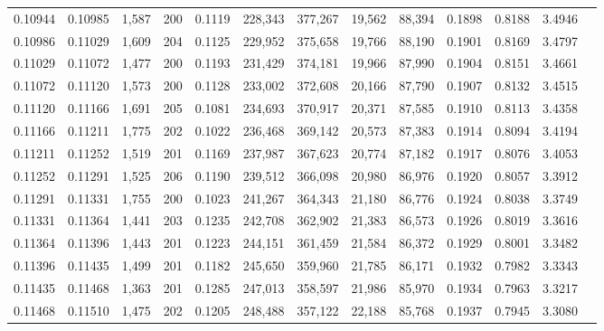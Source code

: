 \begin{tabular}{rrrrrrrrrrrrr}
0.10944 & 0.10985 & 1,587 & 200 &                                     0.1119 & 228,343 & 377,267 &  19,562 &  88,394 & 0.1898 & 0.8188 & 3.4946 \\
0.10986 & 0.11029 & 1,609 & 204 &                                     0.1125 & 229,952 & 375,658 &  19,766 &  88,190 & 0.1901 & 0.8169 & 3.4797 \\
0.11029 & 0.11072 & 1,477 & 200 &                                     0.1193 & 231,429 & 374,181 &  19,966 &  87,990 & 0.1904 & 0.8151 & 3.4661 \\
0.11072 & 0.11120 & 1,573 & 200 &                                     0.1128 & 233,002 & 372,608 &  20,166 &  87,790 & 0.1907 & 0.8132 & 3.4515 \\
0.11120 & 0.11166 & 1,691 & 205 &                                     0.1081 & 234,693 & 370,917 &  20,371 &  87,585 & 0.1910 & 0.8113 & 3.4358 \\
0.11166 & 0.11211 & 1,775 & 202 &                                     0.1022 & 236,468 & 369,142 &  20,573 &  87,383 & 0.1914 & 0.8094 & 3.4194 \\
0.11211 & 0.11252 & 1,519 & 201 &                                     0.1169 & 237,987 & 367,623 &  20,774 &  87,182 & 0.1917 & 0.8076 & 3.4053 \\
0.11252 & 0.11291 & 1,525 & 206 &                                     0.1190 & 239,512 & 366,098 &  20,980 &  86,976 & 0.1920 & 0.8057 & 3.3912 \\
0.11291 & 0.11331 & 1,755 & 200 &                                     0.1023 & 241,267 & 364,343 &  21,180 &  86,776 & 0.1924 & 0.8038 & 3.3749 \\
0.11331 & 0.11364 & 1,441 & 203 &                                     0.1235 & 242,708 & 362,902 &  21,383 &  86,573 & 0.1926 & 0.8019 & 3.3616 \\
0.11364 & 0.11396 & 1,443 & 201 &                                     0.1223 & 244,151 & 361,459 &  21,584 &  86,372 & 0.1929 & 0.8001 & 3.3482 \\
0.11396 & 0.11435 & 1,499 & 201 &                                     0.1182 & 245,650 & 359,960 &  21,785 &  86,171 & 0.1932 & 0.7982 & 3.3343 \\
0.11435 & 0.11468 & 1,363 & 201 &                                     0.1285 & 247,013 & 358,597 &  21,986 &  85,970 & 0.1934 & 0.7963 & 3.3217 \\
0.11468 & 0.11510 & 1,475 & 202 &                                     0.1205 & 248,488 & 357,122 &  22,188 &  85,768 & 0.1937 & 0.7945 & 3.3080 \\

\end{tabular}

